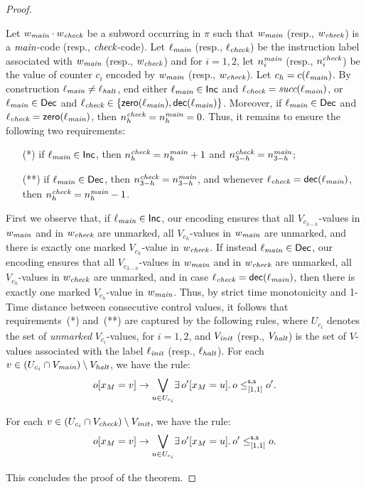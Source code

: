 \begin{proof}
\begin{itemize}
    Let $w_{\textit{main}} \cdot w_{\textit{check}}$ be a subword occurring in $\pi$ such that
    $w_{\textit{main}}$ (resp., $w_{\textit{check}}$) is a ${\textit{main}}$-code (resp., ${\textit{check}}$-code). Let $\ell_{\textit{main}}$ (resp., $\ell_{\textit{check}}$) be the instruction label
    associated with $w_{\textit{main}}$ (resp., $w_{\textit{check}}$) and for $i=1,2$, let $n_i^{{\textit{main}}}$ (resp., $n_i^{{\textit{check}}}$) be the value of counter $c_i$ encoded by
     $w_{\textit{main}}$ (resp., $w_{\textit{check}}$). Let $c_h=c(\ell_{\textit{main}})$. By construction $\ell_{\textit{main}}\neq \ell_{\textit{halt}}$, end either $\ell_{\textit{main}}\in\mathsf{Inc}$   and
     $\ell_{\textit{check}} ={\textit{succ}}(\ell_{\textit{main}})$, or $\ell_{\textit{main}}\in \mathsf{Dec}$  and $\ell_{\textit{check}}\in \{{\mathsf{zero}}(\ell_{\textit{main}}),{\mathsf{dec}}(\ell_{\textit{main}})\}$. Moreover, if $\ell_{\textit{main}}\in \mathsf{Dec}$
     and $\ell_{\textit{check}} = {\mathsf{zero}}(\ell_{\textit{main}})$, then $n_h^{{\textit{check}}}= n_h^{{\textit{main}}}=0$.
     Thus, it remains to ensure the following two requirements:
     \begin{itemize}
       \item[(*)] if $\ell_{\textit{main}}\in\mathsf{Inc}$, then $n_h^{{\textit{check}}}= n_h^{{\textit{main}}}+1$ and $n_{3-h}^{{\textit{check}}}= n_{3-h}^{{\textit{main}}}$;
       \item[(**)] if $\ell_{\textit{main}}\in\mathsf{Dec}$, then $n_{3-h}^{{\textit{check}}}= n_{3-h}^{{\textit{main}}}$, and whenever
       $\ell_{\textit{check}} = {\mathsf{dec}}(\ell_{\textit{main}})$, then $n_h^{{\textit{check}}}= n_h^{{\textit{main}}}-1$.
     \end{itemize}

First we observe that, if $\ell_{\textit{main}}\in\mathsf{Inc}$, our encoding ensures that all $V_{c_{3-h}}$-values in $w_{\textit{main}}$ and in $w_{\textit{check}}$ are unmarked,
all $V_{c_{h}}$-values in  $w_{\textit{main}}$ are unmarked, and there is exactly one marked $V_{c_{h}}$-value  in  $w_{\textit{check}}$.
If instead $\ell_{\textit{main}}\in\mathsf{Dec}$, our encoding ensures that all $V_{c_{3-h}}$-values in $w_{\textit{main}}$ and in $w_{\textit{check}}$ are unmarked,
all $V_{c_{h}}$-values in  $w_{\textit{check}}$ are unmarked, and in case $\ell_{\textit{check}}= {\mathsf{dec}}(\ell_{\textit{main}})$, then there is exactly one marked $V_{c_{h}}$-value  in  $w_{\textit{main}}$.
Thus, by strict time monotonicity and 1-Time distance between consecutive control values, it follows that requirements~(*) and~(**) are captured by the following
rules, where $U_{c_i}$ denotes the set of \emph{unmarked} $V_{c_i}$-values, for $i=1,2$, and $V_{\textit{init}}$ (resp., $V_{\textit{halt}}$) is the set of $V$-values associated with the label $\ell_{\textit{init}}$ (resp., $\ell_{\textit{halt}}$). For each   $v\in (U_{c_i}\cap V_{\textit{main}})\setminus V_{\textit{halt}}$, we have the rule:
   \[
   o[x_M=v] \rightarrow \displaystyle{\bigvee_{u\in U_{c_i}}} \exists\, o'[x_M= u].\, o\leq^{\mathsf{s},\mathsf{s}}_{[1,1]} o'. 
   \]
   
   For each $v\in (U_{c_i}\cap V_{\textit{check}})\setminus V_{\textit{init}}$, we have the rule:
   \[
   o[x_M=v] \rightarrow \displaystyle{\bigvee_{u\in U_{c_i}}} \exists\, o'[x_M= u].\, o'\leq^{\mathsf{s},\mathsf{s}}_{[1,1]} o .
   \]
 \end{itemize}
This concludes the proof of the theorem.
\end{proof}

